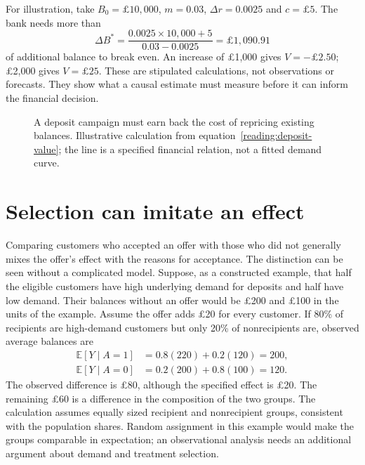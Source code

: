 For illustration, take $B_0=\pounds10{,}000$, $m=0.03$, $\Delta r=0.0025$
and $c=\pounds5$. The bank needs more than
\[
 \Delta B^*=\frac{0.0025\times10{,}000+5}{0.03-0.0025}
 =\pounds1{,}090.91
\]
of additional balance to break even. An increase of \pounds1,000 gives
$V=-\pounds2.50$; \pounds2,000 gives $V=\pounds25$. These are stipulated
calculations, not observations or forecasts. They show what a causal estimate
must measure before it can inform the financial decision.

\begin{figure}[htbp]\centering
{}
\caption{A deposit campaign must earn back the cost of repricing existing
balances. Illustrative calculation from equation~\ref{reading:deposit-value};
the line is a specified financial relation, not a fitted demand curve.}
\label{reading:break-even}
\end{figure}

\section{Selection can imitate an effect}

Comparing customers who accepted an offer with those who did not generally
mixes the offer's effect with the reasons for acceptance. The distinction can
be seen without a complicated model. Suppose, as a constructed example, that
half the eligible customers have high underlying demand for deposits and half
have low demand. Their balances without an offer would be \pounds200 and
\pounds100 in the units of the example. Assume the offer adds \pounds20 for
every customer. If 80\% of recipients are high-demand customers but only 20\%
of nonrecipients are, observed average balances are
\begin{align*}
 \mathbb E[Y\mid A=1]&=0.8(220)+0.2(120)=200,\\
 \mathbb E[Y\mid A=0]&=0.2(200)+0.8(100)=120.
\end{align*}
The observed difference is \pounds80, although the specified effect is
\pounds20. The remaining \pounds60 is a difference in the composition of the
two groups. The calculation assumes equally sized recipient and nonrecipient
groups, consistent with the population shares. Random assignment in this
example would make the groups comparable in expectation; an observational
analysis needs an additional argument about demand and treatment selection.

